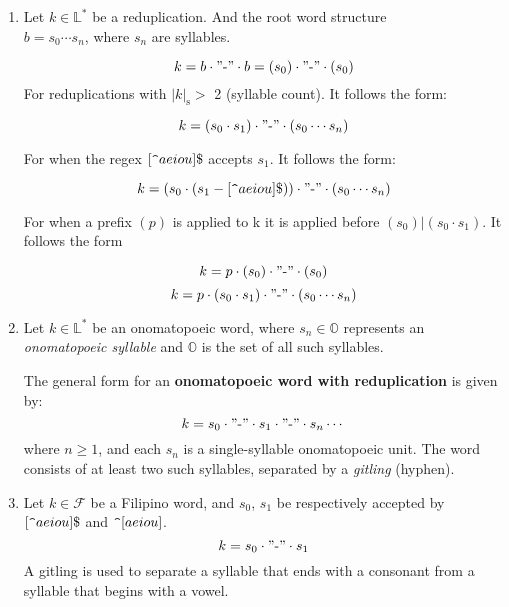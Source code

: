 \begin{enumerate}
      \item
            Let \(k \in \mathbb{L}^*\) be a reduplication. And the root word structure
            \\ \(b = s_0\cdots s_n\), where \(s_n\) are syllables.

            \[
                  k = b \cdot "\text{-}" \cdot b = (s_0) \cdot "\text{-}" \cdot (s_0)
            \]
            For reduplications with $|k|_{\text{s}}>$ 2 (syllable count). It follows the form:

            \[
                  k = (s_0 \cdot s_1) \cdot "\text{-}" \cdot (s_0 \cdots s_n)
            \]

            For when the regex \([\verb|^|aeiou]\$\) accepts $s_1$. It follows the form:

            \[
                  k = (s_0 \cdot (s_1-[\verb|^|aeiou]\$)) \cdot "\text{-}" \cdot (s_0 \cdots s_n)
            \]

            For when a prefix \((p)\) is applied to k it is applied before \((s_0) | (s_0 \cdot s_1)\). It follows the form

            \[
                  k = p \cdot (s_0) \cdot "\text{-}" \cdot (s_0)
            \]
            \[
                  k = p \cdot (s_0 \cdot s_1) \cdot "\text{-}" \cdot (s_0 \cdots s_n)
            \]
      \item
            Let \( k \in \mathbb{L}^* \) be an onomatopoeic word, where \( s_n \in \mathbb{O} \) represents an \textit{onomatopoeic syllable} and \( \mathbb{O} \) is the set of all such syllables.

            The general form for an \textbf{onomatopoeic word with reduplication} is given by:
            \[
                  k = s_0 \cdot "\text{-}" \cdot s_1 \cdot "\text{-}" \cdot s_n \cdots
            \]
            where \( n \geq 1 \), and each \( s_n \) is a single-syllable onomatopoeic unit. The word consists of at least two such syllables, separated by a \textit{gitling} (hyphen).

      \item
            Let \(k \in \mathcal{F}\) be a Filipino word, and $s_0$, $s_1$ be respectively accepted by \([\verb|^|aeiou]\$\) and \(\verb|^|[aeiou]\).
            \[
                  k = s_0 \cdot "\text{-}" \cdot s_1
            \]
            A gitling is used to separate a syllable that ends with a consonant from a syllable that begins with a vowel.\\


\end{enumerate}
